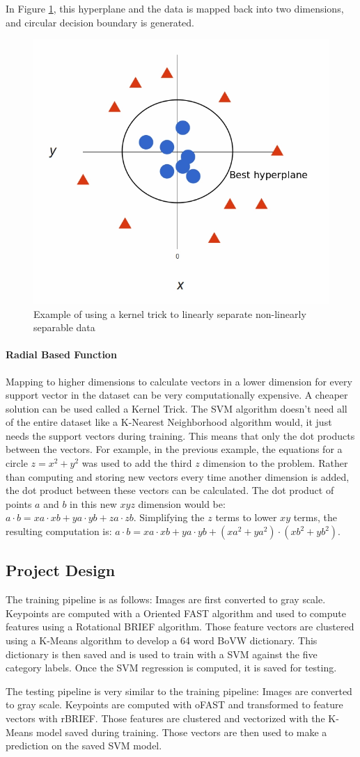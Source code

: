 \documentclass[stu,hidelinks,floatsintext,donotrepeattitle]{apa7}
\begin{document}
In Figure \ref{fig:x-y-hyper}, this hyperplane and the data is mapped back into two dimensions, and circular decision boundary is generated.
\begin{figure}[!h]
  \centering
  \captionsetup{justification=centering, margin=2cm}
  \includegraphics[width=.5\textwidth]{x-y-hyper}
  \vspace*{3mm}
  \caption{Example of using a kernel trick to linearly separate non-linearly separable data \parencite{svm-img}}
  \label{fig:x-y-hyper}
\end{figure}
\paragraph{Radial Based Function}
Mapping to higher dimensions to calculate vectors in a lower dimension for every support vector in the dataset can be very computationally expensive. A cheaper solution can be used called a Kernel Trick. The SVM algorithm doesn't need all of the entire dataset like a K-Nearest Neighborhood algorithm would, it just needs the support vectors during training. This means that only the dot products between the vectors. For example, in the previous example, the equations for a circle $z=x^2+y^2$ was used to add the third $z$ dimension to the problem. Rather than computing and storing new vectors every time another dimension is added, the dot product between these vectors can be calculated. The dot product of points $a$ and $b$ in this new $xyz$ dimension would be: $a \cdot b = xa \cdot xb + ya \cdot yb + za \cdot zb$. Simplifying the $z$ terms to lower $xy$ terms, the resulting computation is: $a \cdot b = xa \cdot xb + ya \cdot yb + (xa^2+ya^2) \cdot (xb^2+yb^2)$.
\subsection{Project Design}
The training pipeline is as follows: Images are first converted to gray scale. Keypoints are computed with a Oriented FAST algorithm and used to compute features using a Rotational BRIEF algorithm. Those feature vectors are clustered using a K-Means algorithm to develop a 64 word BoVW dictionary. This dictionary is then saved and is used to train with a SVM against the five category labels. Once the SVM regression is computed, it is saved for testing.\par
The testing pipeline is very similar to the training pipeline: Images are converted to gray scale. Keypoints are computed with oFAST and transformed to feature vectors with rBRIEF. Those features are clustered and vectorized with the K-Means model saved during training. Those vectors are then used to make a prediction on the saved SVM model.
\end{document}
